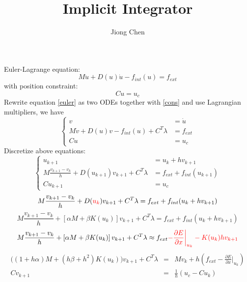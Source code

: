 \documentclass[a4paper,9pt,twocolumn]{extarticle}
\title{Implicit Integrator}
\author{Jiong Chen}
\newcommand{\TODO}[1]{\textcolor{red}{#1}}
\begin{document}
\maketitle

Euler-Lagrange equation:
\begin{equation}
	M\ddot u + D(u)\dot u - f_{int}(u) = f_{ext} \label{euler}
\end{equation}
with position constraint:
\begin{equation}
 Cu = u_c \label{cons}
\end{equation}
Rewrite equation \eqref{euler} as two ODEs together with \eqref{cons} and use Lagrangian multipliers, we have
\begin{equation*}
  \left\{
   \begin{aligned}
			v &= \dot u \\
			M\dot v + D(u)v - f_{int}(u) + C^T\lambda &= f_{ext} \\
			Cu &= u_c 
   \end{aligned}
   \right.
  \end{equation*}
Discretize above equations:
\begin{equation*}
  \left\{
   \begin{aligned}
			u_{k+ 1} &= u_k + hv_{k+1} \\
			M\frac{v_{k+1} - v_k}{h} + D(u_{k+1})v_{k+1}  + C^T\lambda &= f_{ext} + f_{int}(u_{k+1})\\
			Cu_{k+1} &= u_c 
   \end{aligned}
   \right.
  \end{equation*}
\begin{equation*}
M\frac{v_{k+1} - v_k}{h} + D(\TODO{u_k})v_{k+1}  + C^T\lambda = f_{ext} + f_{int}(u_k + hv_{k + 1})
\end{equation*}
\begin{equation*}
M\frac{v_{k+1} - v_k}{h} + \left[\alpha M + \beta K(u_k)\right]v_{k+1}  + C^T\lambda = f_{ext} + f_{int}(u_k + hv_{k + 1})
\end{equation*}
\begin{equation*}
M\frac{v_{k+1} - v_k}{h} + \left[\alpha M + \beta K(u_k)\right]v_{k+1}  + C^T\lambda \approx f_{ext} \TODO{- \frac{\partial E}{\partial x}\bigg|_{u_k} - K(u_k) hv_{k +1}}
\end{equation*}
\begin{eqnarray*}
\big((1 + h\alpha )M + (h\beta + h^2)K(u_k) \big )v_{k + 1} + C^T \lambda &=& Mv_k + h(f_{ext} - \frac{\partial E}{\partial x}\bigg|_{u_k}) \\
Cv_{k + 1} &=& \frac{1}{h} (u_c - Cu_k)
\end{eqnarray*}
\end{document}
